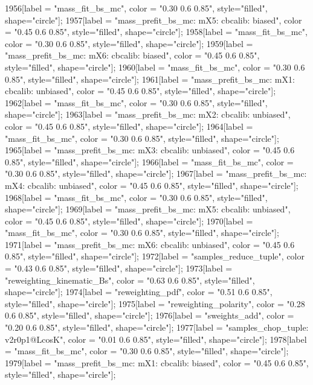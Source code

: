 {	1956[label = "mass_fit_bs_mc", color = "0.30 0.6 0.85", style="filled", shape="circle"];
	1957[label = "mass_prefit_bs_mc\nmassbin: mX5\nmassmodel: cbcalib\ntrigger: biased", color = "0.45 0.6 0.85", style="filled", shape="circle"];
	1958[label = "mass_fit_bs_mc", color = "0.30 0.6 0.85", style="filled", shape="circle"];
	1959[label = "mass_prefit_bs_mc\nmassbin: mX6\nmassmodel: cbcalib\ntrigger: biased", color = "0.45 0.6 0.85", style="filled", shape="circle"];
	1960[label = "mass_fit_bs_mc", color = "0.30 0.6 0.85", style="filled", shape="circle"];
	1961[label = "mass_prefit_bs_mc\nmassbin: mX1\nmassmodel: cbcalib\ntrigger: unbiased", color = "0.45 0.6 0.85", style="filled", shape="circle"];
	1962[label = "mass_fit_bs_mc", color = "0.30 0.6 0.85", style="filled", shape="circle"];
	1963[label = "mass_prefit_bs_mc\nmassbin: mX2\nmassmodel: cbcalib\ntrigger: unbiased", color = "0.45 0.6 0.85", style="filled", shape="circle"];
	1964[label = "mass_fit_bs_mc", color = "0.30 0.6 0.85", style="filled", shape="circle"];
	1965[label = "mass_prefit_bs_mc\nmassbin: mX3\nmassmodel: cbcalib\ntrigger: unbiased", color = "0.45 0.6 0.85", style="filled", shape="circle"];
	1966[label = "mass_fit_bs_mc", color = "0.30 0.6 0.85", style="filled", shape="circle"];
	1967[label = "mass_prefit_bs_mc\nmassbin: mX4\nmassmodel: cbcalib\ntrigger: unbiased", color = "0.45 0.6 0.85", style="filled", shape="circle"];
	1968[label = "mass_fit_bs_mc", color = "0.30 0.6 0.85", style="filled", shape="circle"];
	1969[label = "mass_prefit_bs_mc\nmassbin: mX5\nmassmodel: cbcalib\ntrigger: unbiased", color = "0.45 0.6 0.85", style="filled", shape="circle"];
	1970[label = "mass_fit_bs_mc", color = "0.30 0.6 0.85", style="filled", shape="circle"];
	1971[label = "mass_prefit_bs_mc\nmassbin: mX6\nmassmodel: cbcalib\ntrigger: unbiased", color = "0.45 0.6 0.85", style="filled", shape="circle"];
	1972[label = "samples_reduce_tuple", color = "0.43 0.6 0.85", style="filled", shape="circle"];
	1973[label = "reweighting_kinematic_Bs", color = "0.63 0.6 0.85", style="filled", shape="circle"];
	1974[label = "reweighting_pdf", color = "0.51 0.6 0.85", style="filled", shape="circle"];
	1975[label = "reweighting_polarity", color = "0.28 0.6 0.85", style="filled", shape="circle"];
	1976[label = "sweights_add", color = "0.20 0.6 0.85", style="filled", shape="circle"];
	1977[label = "samples_chop_tuple\nversion: v2r0p1@LcosK", color = "0.01 0.6 0.85", style="filled", shape="circle"];
	1978[label = "mass_fit_bs_mc", color = "0.30 0.6 0.85", style="filled", shape="circle"];
	1979[label = "mass_prefit_bs_mc\nmassbin: mX1\nmassmodel: cbcalib\ntrigger: biased", color = "0.45 0.6 0.85", style="filled", shape="circle"];
}
